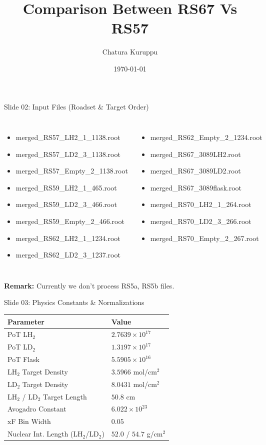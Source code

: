 \documentclass[aspectratio=169]{beamer}
\title{Comparison Between RS67 Vs RS57}
\author{Chatura Kuruppu}
\date{\today}
\begin{document}
\begin{frame}
\titlepage
\end{frame}
\begin{frame}{Slide 02: Input Files (Roadset \& Target Order)}
\begin{columns}
\tiny\begin{itemize}
\item merged\_RS57\_LH2\_1\_1138.root
\item merged\_RS57\_LD2\_3\_1138.root
\item merged\_RS57\_Empty\_2\_1138.root
\item merged\_RS59\_LH2\_1\_465.root
\item merged\_RS59\_LD2\_3\_466.root
\item merged\_RS59\_Empty\_2\_466.root
\item merged\_RS62\_LH2\_1\_1234.root
\item merged\_RS62\_LD2\_3\_1237.root
\end{itemize}\tiny\begin{itemize}
\item merged\_RS62\_Empty\_2\_1234.root
\item merged\_RS67\_3089LH2.root
\item merged\_RS67\_3089LD2.root
\item merged\_RS67\_3089flask.root
\item merged\_RS70\_LH2\_1\_264.root
\item merged\_RS70\_LD2\_3\_266.root
\item merged\_RS70\_Empty\_2\_267.root
\end{itemize}\end{columns}
\vspace{0.3cm}\centering\small\textbf{Remark:} Currently we don't process RS5a, RS5b files.
\end{frame}
\begin{frame}{Slide 03: Physics Constants \& Normalizations}
\centering\footnotesize
\begin{tabular}{ll}
\toprule \textbf{Parameter} & \textbf{Value} \\ \midrule
PoT LH$_2$ & $2.7639 \times 10^{17}$ \\
PoT LD$_2$ & $1.3197 \times 10^{17}$ \\
PoT Flask & $5.5905 \times 10^{16}$ \\
LH$_2$ Target Density & $3.5966$ mol/cm$^2$ \\
LD$_2$ Target Density & $8.0431$ mol/cm$^2$ \\
LH$_2$ / LD$_2$ Target Length & $50.8$ cm \\
Avogadro Constant & $6.022 \times 10^{23}$ \\
xF Bin Width & $0.05$ \\
Nuclear Int. Length (LH$_2$/LD$_2$) & $52.0$ / $54.7$ g/cm$^2$ \\
\bottomrule \end{tabular}
\end{frame}
\end{document}
